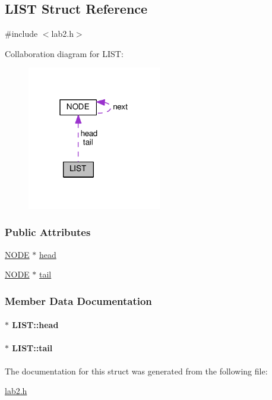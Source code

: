 \hypertarget{structLIST}{\subsection{L\+I\+S\+T Struct Reference}
\label{structLIST}
}


{\ttfamily \#include $<$lab2.\+h$>$}



Collaboration diagram for L\+I\+S\+T\+:\nopagebreak
\begin{figure}[H]
\begin{center}
\leavevmode
\includegraphics[width=166pt]{structLIST__coll__graph}
\end{center}
\end{figure}
\subsubsection*{Public Attributes}
\begin{DoxyCompactItemize}
\item 
\hyperlink{structNODE}{N\+O\+D\+E} $\ast$ \hyperlink{structLIST_ae323ec1de25d94a33afe4ce1f284aa4a}{head}
\item 
\hyperlink{structNODE}{N\+O\+D\+E} $\ast$ \hyperlink{structLIST_ae368e86b81297fad05605d8e7fd7254b}{tail}
\end{DoxyCompactItemize}


\subsubsection{Member Data Documentation}
\hypertarget{structLIST_ae323ec1de25d94a33afe4ce1f284aa4a}{
\paragraph[{head}]{$\ast$ L\+I\+S\+T\+::head}}\label{structLIST_ae323ec1de25d94a33afe4ce1f284aa4a}
\hypertarget{structLIST_ae368e86b81297fad05605d8e7fd7254b}{
\paragraph[{tail}]{$\ast$ L\+I\+S\+T\+::tail}}\label{structLIST_ae368e86b81297fad05605d8e7fd7254b}


The documentation for this struct was generated from the following file\+:\begin{DoxyCompactItemize}
\item 
\hyperlink{lab2_8h}{lab2.\+h}\end{DoxyCompactItemize}
